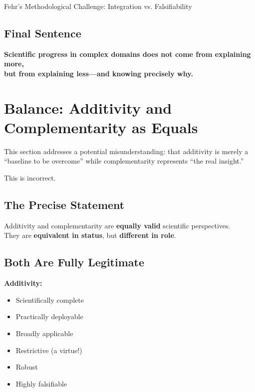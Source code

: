 \begin{chapter}{Fehr's Methodological Challenge: Integration vs. Falsifiability}
\subsection{Final Sentence}

\begin{tcolorbox}[colback=blue!10!white,colframe=blue!75!black]
\begin{center}
\Large
\textbf{Scientific progress in complex domains does not come from explaining more,\\
but from explaining less---and knowing precisely why.}
\end{center}
\end{tcolorbox}


\section{Balance: Additivity and Complementarity as Equals}
\label{sec:balance}

This section addresses a potential misunderstanding: that additivity is merely a ``baseline to be overcome'' while complementarity represents ``the real insight.''

This is incorrect.

\subsection{The Precise Statement}

\begin{tcolorbox}[colback=green!5!white,colframe=green!75!black,title=\textbf{The Balance Principle}]
\begin{center}
\large
Additivity and complementarity are \textbf{equally valid} scientific perspectives.\\[0.5em]
They are \textbf{equivalent in status}, but \textbf{different in role}.
\end{center}
\end{tcolorbox}

\subsection{Both Are Fully Legitimate}

\textbf{Additivity:}
\begin{itemize}[noitemsep]
    \item Scientifically complete
    \item Practically deployable
    \item Broadly applicable
    \item Restrictive (a virtue!)
    \item Robust
    \item Highly falsifiable
\end{itemize}


\end{chapter}
